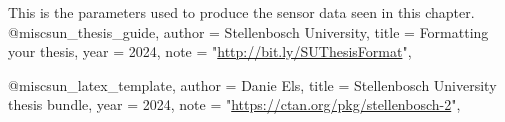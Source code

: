This is the parameters used to produce the sensor data seen in this chapter.
@misc{sun_thesis_guide,
	author = {{Stellenbosch University}},
    title = {Formatting your thesis},
	year = {2024},
    note = "\url{http://bit.ly/SUThesisFormat}",
}

@misc{sun_latex_template,
	author = {Danie Els},
    title = {Stellenbosch University thesis bundle},
	year = {2024},
    note = "\url{https://ctan.org/pkg/stellenbosch-2}",
}